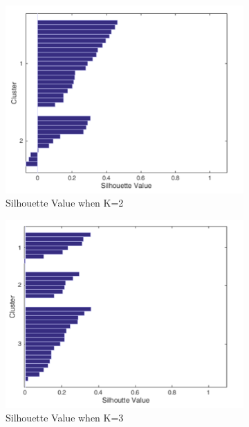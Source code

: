 \newpage 
\begin{figure}[!hbt]\centering
    \begin{subfigure}{0.45\textwidth}
 \includegraphics[width=\textwidth]{persona3a}
 \caption{Silhouette Value when K=2}
    \end{subfigure}\hspace{0.01\textwidth}
    \begin{subfigure}{0.45\textwidth}
\includegraphics[width=\textwidth]{persona3b}
  \caption{Silhouette Value when K=3}
    \end{subfigure}
    \begin{subfigure}{0.45\textwidth}

\end{subfigure}
\end{figure}
